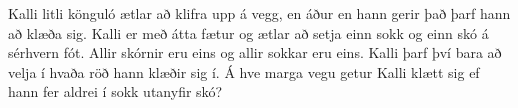 Kalli litli könguló ætlar að klifra upp á vegg, en áður en hann gerir það þarf hann að klæða sig. Kalli er með átta fætur og ætlar að setja einn sokk og einn skó á sérhvern fót. Allir skórnir eru eins og allir sokkar eru eins. Kalli þarf því bara að velja í hvaða röð hann klæðir sig í. Á hve marga vegu getur Kalli klætt sig ef hann fer aldrei í sokk utanyfir skó?